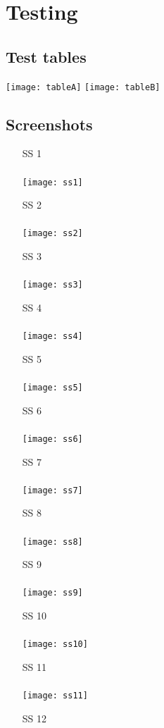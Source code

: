 \documentclass[a4paper, 11pt, titlepage]{article}
\begin{document}
\section{Testing}
\subsection{Test tables}
\texttt{[image: tableA]}
\texttt{[image: tableB]}
\newpage

\subsection{Screenshots}
\begin{enumerate}
	\item[SS]1\\\\
		\texttt{[image: ss1]}
	\item[SS]2\\\\
		\texttt{[image: ss2]} \newpage
	\item[SS]3\\\\
		\texttt{[image: ss3]}
	\item[SS]4\\\\ 
		\texttt{[image: ss4]}
	\item[SS]5\\\\ 
		\texttt{[image: ss5]} \newpage
	\item[SS]6\\\\
		\texttt{[image: ss6]}
	\item[SS]7\\\\ 
		\texttt{[image: ss7]}
	\item[SS]8\\\\ 
		\texttt{[image: ss8]} \newpage
	\item[SS]9\\\\ 
		\texttt{[image: ss9]}
	\item[SS]10\\\\ 
		\texttt{[image: ss10]} \newpage
	\item[SS]11\\\\ 
		\texttt{[image: ss11]}
	\item[SS]12\\\\ 

\end{enumerate}
\end{document}

